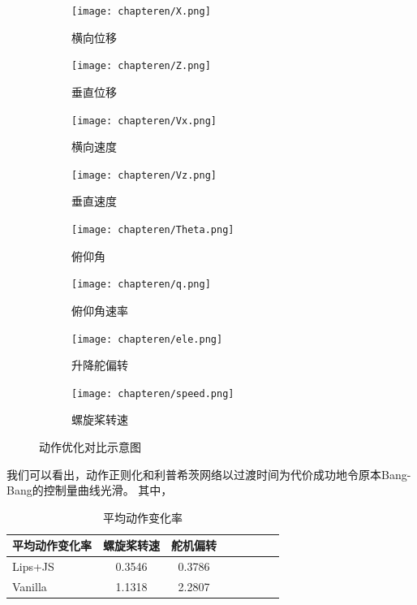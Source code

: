 \begin{figure}[H]
    \centering
    \begin{subfigure}{.46\textwidth}
        \centering
        \texttt{[image: chapteren/X.png]}
        \caption{横向位移}
        \label{fig:actionsub1}
    \end{subfigure}%
    \begin{subfigure}{.46\textwidth}
        \centering
        \texttt{[image: chapteren/Z.png]}
        \caption{垂直位移}
        \label{fig:actionsub2}
    \end{subfigure}
    \begin{subfigure}{.46\textwidth}
        \centering
        \texttt{[image: chapteren/Vx.png]}
        \caption{横向速度}
        \label{fig:actionsub3}
    \end{subfigure}%
    \begin{subfigure}{.46\textwidth}
        \centering
        \texttt{[image: chapteren/Vz.png]}
        \caption{垂直速度}
        \label{fig:actionsub4}
    \end{subfigure}
    \begin{subfigure}{.46\textwidth}
        \centering
        \texttt{[image: chapteren/Theta.png]}
        \caption{俯仰角}
        \label{fig:actionsub5}
    \end{subfigure}%
    \begin{subfigure}{.46\textwidth}
        \centering
        \texttt{[image: chapteren/q.png]}
        \caption{俯仰角速率}
        \label{fig:actionsub6}
    \end{subfigure}
    \begin{subfigure}{.46\textwidth}
        \centering
        \texttt{[image: chapteren/ele.png]}
        \caption{升降舵偏转}
        \label{fig:actionsub7}
    \end{subfigure}%
    \begin{subfigure}{.46\textwidth}
        \centering
        \texttt{[image: chapteren/speed.png]}
        \caption{螺旋桨转速}
        \label{fig:actionsub8}
    \end{subfigure}
    \caption{动作优化对比示意图}
    \label{fig:action_smooth}
\end{figure}
我们可以看出，动作正则化和利普希茨网络以过渡时间为代价成功地令原本Bang-Bang的控制量曲线光滑。
其中，
\begin{table}[h]
    \centering
    \caption{平均动作变化率}
    \label{tab:nora}
    \small %
    \begin{tabular*}{0.85\textwidth}{@{\extracolsep{\fill}}lccccccc}
        \toprule
        平均动作变化率 & 螺旋桨转速 & 舵机偏转 \\
        \midrule
        Lips+JS & 0.3546 & 0.3786\\
        Vanilla & 1.1318 & 2.2807 \\
        \bottomrule
    \end{tabular*}
\end{table}

